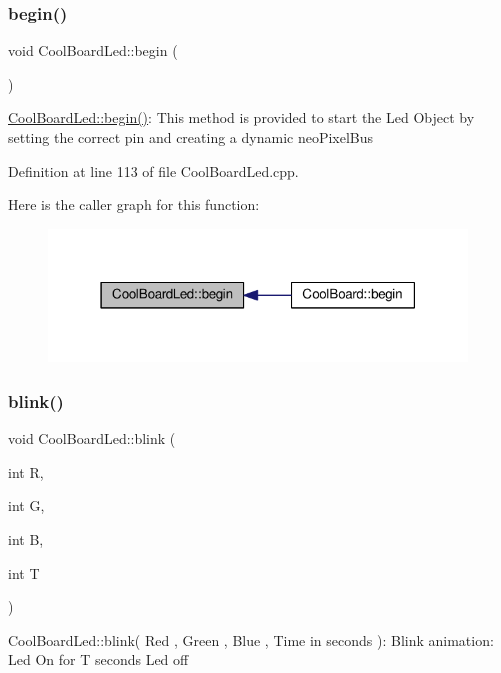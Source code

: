 \subsubsection{\texorpdfstring{begin()}{begin()}}
{\footnotesize\ttfamily void Cool\+Board\+Led\+::begin (\begin{DoxyParamCaption}{ }\end{DoxyParamCaption})}

\hyperlink{class_cool_board_led_ae3cbde8affcc6f011cbd698c8ef911f6}{Cool\+Board\+Led\+::begin()}\+: This method is provided to start the Led Object by setting the correct pin and creating a dynamic neo\+Pixel\+Bus 

Definition at line 113 of file Cool\+Board\+Led.\+cpp.

Here is the caller graph for this function\+:
\nopagebreak
\begin{figure}[H]
\begin{center}
\leavevmode
\includegraphics[width=315pt]{de/dc0/class_cool_board_led_ae3cbde8affcc6f011cbd698c8ef911f6_icgraph}
\end{center}
\end{figure}
\mbox{\label{class_cool_board_led_a27706bc029f6a126c55d0b91624ad7fa}} 
\subsubsection{\texorpdfstring{blink()}{blink()}}
{\footnotesize\ttfamily void Cool\+Board\+Led\+::blink (\begin{DoxyParamCaption}\item[{int}]{R,  }\item[{int}]{G,  }\item[{int}]{B,  }\item[{int}]{T }\end{DoxyParamCaption})}

Cool\+Board\+Led\+::blink( Red , Green , Blue , Time in seconds )\+: Blink animation\+: Led On for T seconds Led off 

